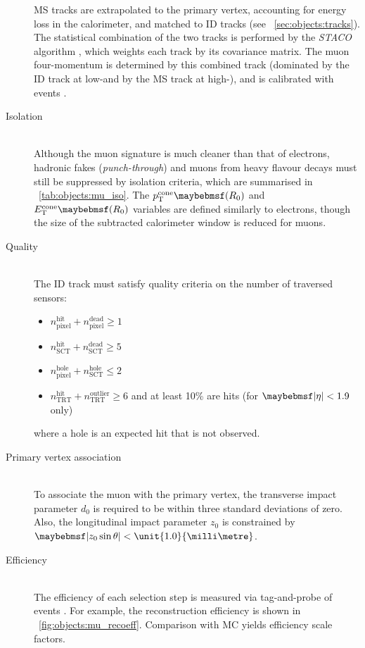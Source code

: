 \begin{description}
	\ac{MS} tracks are extrapolated to the primary vertex, accounting for energy loss in 
	the calorimeter, and matched to \ac{ID} tracks (see 
	\Section~\ref{sec:objects:tracks}). The statistical combination of the two 
	tracks is performed by the \textit{STACO} algorithm \cite{Muons:algorithms}, which
	weights each track by its covariance matrix. The muon four-momentum is determined 
	by this combined track (dominated by the \ac{ID} track at low-\pt and by the 
	\ac{MS} track at high-\pt), and is calibrated with \HepProcess{\PZ \HepTo \Pmu\Pmu}
	events \cite{Muons:2012}.
\item[Isolation] \hfill \\
	Although the muon signature is much cleaner than that of electrons, hadronic fakes 
	(\textit{punch-through}) and muons from heavy flavour decays must still be suppressed 
	by isolation criteria, which are summarised in \Table~\ref{tab:objects:mu_iso}. The 
	$p_{\text{T}}^{\text{cone}}\parenths{R_0}$ and 
	$E_{\text{T}}^{\text{cone}}\parenths{R_0}$ variables are defined similarly to 
	electrons, though the size of the subtracted calorimeter window is reduced for muons.
\item[Quality] \hfill \\
	The \ac{ID} track must satisfy quality criteria on the number of traversed sensors:
	\begin{itemize}[noitemsep,nolistsep]
		\item $n_{\text{pixel}}^{\text{hit}} + n_{\text{pixel}}^{\text{dead}} \geq 1$
		\item $n_{\text{SCT}}^{\text{hit}} + n_{\text{SCT}}^{\text{dead}} \geq 5$
		\item $n_{\text{pixel}}^{\text{hole}} + n_{\text{SCT}}^{\text{hole}} \leq 2$
		\item $n_{\text{TRT}}^{\text{hit}} + n_{\text{TRT}}^{\text{outlier}} \geq 6$ and 
		at least 10\% are hits (for $\mods{\eta} < 1.9$ only)
	\end{itemize}
	where a hole is an expected hit that is not observed.
\item[Primary vertex association] \hfill \\
	To associate the muon with the primary vertex, the transverse impact parameter $d_0$ 
	is required to be within three standard deviations of zero. Also, the longitudinal 
	impact parameter $z_0$ is constrained by $\mods{z_0 \sin\theta} < 
	\unit{1.0}{\milli\metre}$.
\item[Efficiency] \hfill \\
	The efficiency of each selection step is measured via tag-and-probe of 
	\HepProcess{\PZ \HepTo \Pmu\Pmu} events \cite{Muons:2012}. For example, the 
	reconstruction efficiency is shown in \Figure~\ref{fig:objects:mu_recoeff}. 
	Comparison with MC yields efficiency scale factors.
\end{description}

